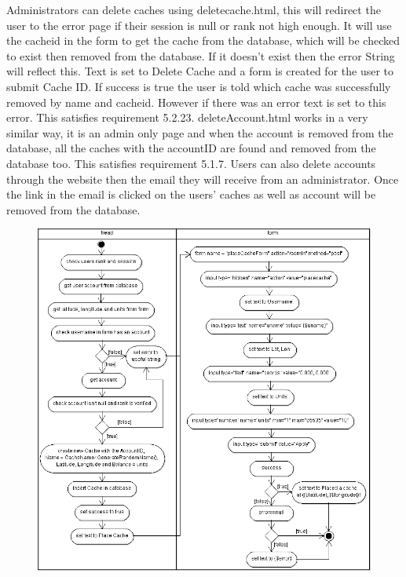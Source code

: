 Administrators can delete caches using deletecache.html, this will redirect the user to the error page if their session is null or rank not high enough. It will use the cacheid in the form to get the cache from the database, which will be checked to exist then removed from the database. If it doesn't exist then the error String will reflect this. Text is set to Delete Cache and a form is created for the user to submit Cache ID. If success is true the user is told which cache was successfully removed by name and cacheid. However if there was an error text is set to this error. This satisfies requirement 5.2.23. deleteAccount.html works in a very similar way, it is an admin only page and when the account is removed from the database, all the caches with the accountID are found and removed from the database too. This satisfies requirement 5.1.7. Users can also delete accounts through the website then the email they will receive from an administrator. Once the link in the email is clicked on the users' caches as well as account will be removed from the database.

\begin{figure}
    \centering
    \includegraphics[width=\textwidth]{images/activity/admin-placecache}
\end{figure}
